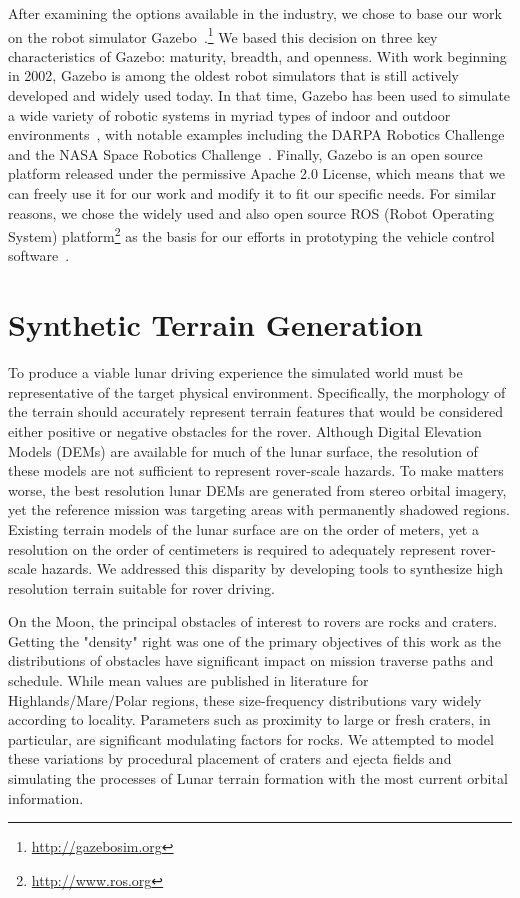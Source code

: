 \documentclass[twocolumn,letterpaper]{IEEEAerospaceCLS}  %
\begin{document}
After examining the options available in the industry, we chose to base our work on the robot simulator Gazebo~\cite{koenig2004design}.\footnote{\url{http://gazebosim.org}}
We based this decision on three key characteristics of Gazebo: maturity, breadth, and openness.
With work beginning in 2002, Gazebo is among the oldest robot simulators that is still actively developed and widely used today.
In that time, Gazebo has been used to simulate a wide variety of robotic systems in myriad types of indoor and outdoor environments~\cite{paepcke2016gazebo}, with notable examples including the DARPA Robotics Challenge~\cite{aguero2015inside} and the NASA Space Robotics Challenge~\cite{hambuchen2017nasa}.
Finally, Gazebo is an open source platform released under the permissive Apache 2.0 License, which means that we can freely use it for our work and modify it to fit our specific needs.
For similar reasons, we chose the widely used and also open source ROS (Robot Operating System) platform\footnote{\url{http://www.ros.org}} as the basis for our efforts in prototyping the vehicle control software~\cite{quigley2009ros}.

\section{Synthetic Terrain Generation}

To produce a viable lunar driving experience the simulated world must be representative of the target physical environment. 
Specifically, the morphology of the terrain should accurately represent terrain features that would be considered either positive or negative obstacles for the rover. 
Although Digital Elevation Models (DEMs) are available for much of the lunar surface, the resolution of these models are not sufficient to represent rover-scale hazards. 
To make matters worse, the best resolution lunar DEMs are generated from stereo orbital imagery, yet the reference mission was targeting areas with permanently shadowed regions. 
Existing terrain models of the lunar surface are on the order of meters, yet a resolution on the order of centimeters is required to adequately represent rover-scale hazards. 
We addressed this disparity by developing tools to synthesize high resolution terrain suitable for rover driving. 

On the Moon, the principal obstacles of interest to rovers are rocks and craters. 
Getting the "density" right was one of the primary objectives of this work as the distributions of obstacles have significant impact on mission traverse paths and schedule. 
While mean values are published in literature \cite{Surveyor1968} for Highlands/Mare/Polar regions, these size-frequency distributions vary widely according to locality. 
Parameters such as proximity to large or fresh craters, in particular, are significant modulating factors for rocks. 
We attempted to model these variations by procedural placement of craters and ejecta fields and simulating the processes of Lunar terrain formation with the most current orbital information. 
\end{document}
